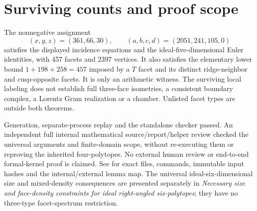 \documentclass[11pt]{article}
\begin{document}
\section{Surviving counts and proof scope}
The nonnegative assignment
\[
 (x,y,z)=(361,66,30),\qquad (a,b,c,d)=(2051,241,105,0)
\]
satisfies the displayed incidence equations and the ideal-five-dimensional
Euler identities, with 457 facets and 2397 vertices. It also satisfies
the elementary lower bound $1+198+258=457$ imposed by a $T$ facet and
its distinct ridge-neighbor and cusp-opposite facets.
It is only an arithmetic witness. The surviving local labeling does
not establish full three-face isometries, a consistent boundary complex,
a Lorentz Gram realization or a chamber. Unlisted facet types are outside
both theorems.

Generation, separate-process replay and the standalone checker passed.
An independent full internal mathematical source/report/helper review
checked the universal arguments and finite-domain scope, without
re-executing them or reproving the inherited four-polytopes. No external
human review or end-to-end formal-kernel proof is claimed.
See  for exact files,
commands, immutable input hashes and the internal/external lemma map.
The universal ideal-six-dimensional size and mixed-density consequences
are presented separately in
\emph{Necessary size and face-density constraints for ideal right-angled
six-polytopes}; they have no three-type facet-spectrum restriction.
\end{document}
